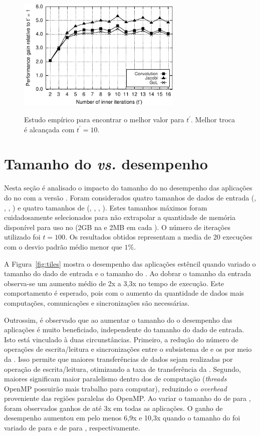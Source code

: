 \begin{figure}
  \centering
	\caption{Estudo empírico para encontrar o melhor valor para $t^\prime$. Melhor troca é alcançada com $t^\prime=10$.}
	\includegraphics[width=0.7\textwidth]{figs/MPPAPlotIterationsAPI100It16InnerIt.pdf}
	\label{fig:tprime}
\end{figure}

\section{Tamanho do \tile \textit{vs.} desempenho}
\label{sec:tam_tile_desempenho}

Nesta seção é analisado o impacto do tamanho do \tile no desempenho das aplicações do \pskel no \mppa com a versão \async. Foram considerados quatro tamanhos de dados de entrada (\ina, \inb, \inc, \ind) e quatro tamanhos de \tiles (\tilea, \tileb, \tilec, \tiled). Estes tamanhos máximos foram cuidadosamente selecionados para não extrapolar a quantidade de memória disponível para uso no \mppa (2GB na \lpddr e 2MB em cada \cluster). O número de iterações utilizado foi $t = 100$. Os resultados obtidos representam a media de 20 execuções com o desvio padrão médio menor que $1\%$. 

A Figura~\ref{fig:tiles} mostra o desempenho das aplicações estêncil quando variado o tamanho do dado de entrada e o tamanho do \tile. Ao dobrar o tamanho da entrada observa-se um aumento médio de 2x a 3,3x no tempo de execução. Este comportamento é esperado, pois com o aumento da quantidade de dados mais computações, comunicações e sincronizações são necessárias.

Outrossim, é observado que ao aumentar o tamanho do \tile o desempenho das aplicações é muito beneficiado, independente do tamanho do dado de entrada. Isto está vinculado à duas circunstâncias. Primeiro, a redução do número de operações de escrita/leitura e sincronizações entre o subsistema de \io e os \clusters por meio da \noc. Isso permite que maiores transferências de dados sejam realizadas por operação de escrita/leitura, otimizando a taxa de transferência da \noc. Segundo, maiores \tiles significam maior paralelismo dentro dos \clusters de computação (\ie \textit{threads} OpenMP possuirão mais trabalho para computar), reduzindo o \textit{overhead} proveniente das regiões paralelas do OpenMP. Ao variar o tamanho do \tile de \tilea para \tileb, foram observados ganhos de até 3x em todas as aplicações. O ganho de desempenho aumentou em pelo menos 6,9x e 10,3x quando o tamanho do \tile foi variado de \tilea para \tilec e de \tilea para \tiled, respectivamente.

